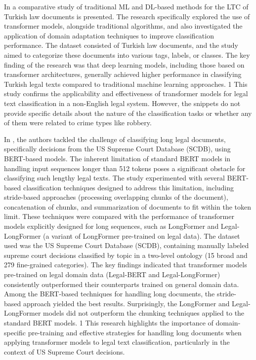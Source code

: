 \documentclass[onecolumn, journal, english, 12pt, a4paper]{IEEEtran} %
\theoremstyle{definition}
\begin{document}
In \cite{Akca2022} a comparative study of traditional ML and DL-based
methods for the LTC of Turkish law documents is presented. The
research specifically explored the use of transformer models,
alongside traditional algorithms, and also investigated the
application of domain adaptation techniques to improve classification
performance. The dataset consisted of Turkish law documents, and the
study aimed to categorize these documents into various tags, labels,
or classes. The key finding of the research was that deep learning
models, including those based on transformer architectures, generally
achieved higher performance in classifying Turkish legal texts
compared to traditional machine learning approaches. 1 This study
confirms the applicability and effectiveness of transformer models for
legal text classification in a non-English legal system. However, the
snippets do not provide specific details about the nature of the
classification tasks or whether any of them were related to crime
types like robbery.

In \cite{Vatsal2023}, the authors tackled the challenge of classifying
long legal documents, specifically decisions from the US Supreme Court
Database (SCDB), using BERT-based models. The inherent limitation of
standard BERT models in handling input sequences longer than 512
tokens poses a significant obstacle for classifying such lengthy legal
texts. The study experimented with several BERT-based classification
techniques designed to address this limitation, including stride-based
approaches (processing overlapping chunks of the document),
concatenation of chunks, and summarization of documents to fit within
the token limit. These techniques were compared with the performance
of transformer models explicitly designed for long sequences, such as
LongFormer and Legal-LongFormer (a variant of LongFormer pre-trained
on legal data).  The dataset used was the US Supreme Court Database
(SCDB), containing manually labeled supreme court decisions classified
by topic in a two-level ontology (15 broad and 279 fine-grained
categories).  The key findings indicated that transformer models
pre-trained on legal domain data (Legal-BERT and Legal-LongFormer)
consistently outperformed their counterparts trained on general domain
data. Among the BERT-based techniques for handling long documents, the
stride-based approach yielded the best results. Surprisingly, the
LongFormer and Legal-LongFormer models did not outperform the chunking
techniques applied to the standard BERT models. 1 This research
highlights the importance of domain-specific pre-training and
effective strategies for handling long documents when applying
transformer models to legal text classification, particularly in the
context of US Supreme Court decisions.
\end{document}
